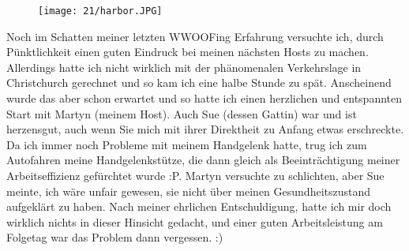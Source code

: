 \begin{figure}[h]
  \centering
  \texttt{[image: 21/harbor.JPG]}
\end{figure}
Noch im Schatten meiner letzten WWOOFing Erfahrung versuchte ich, durch
Pünktlichkeit einen guten Eindruck bei meinen nächsten Hosts zu machen.
Allerdings hatte ich nicht wirklich mit der phänomenalen Verkehrslage in
Christchurch gerechnet und so kam ich eine halbe Stunde zu spät.
Anscheinend wurde das aber schon erwartet und so hatte ich einen
herzlichen und entspannten Start mit Martyn (meinem Host). Auch Sue
(dessen Gattin) war und ist herzensgut, auch wenn Sie mich mit ihrer
Direktheit zu Anfang etwas erschreckte. Da ich immer noch Probleme mit
meinem Handgelenk hatte, trug ich zum Autofahren meine Handgelenkstütze,
die dann gleich als Beeinträchtigung meiner Arbeitseffizienz gefürchtet
wurde :P. Martyn versuchte zu schlichten, aber Sue meinte, ich wäre
unfair gewesen, sie nicht über meinen Gesundheitszustand aufgeklärt zu
haben. Nach meiner ehrlichen Entschuldigung, hatte ich mir doch wirklich
nichts in dieser Hinsicht gedacht, und einer guten Arbeitsleistung am
Folgetag war das Problem dann vergessen. :)
